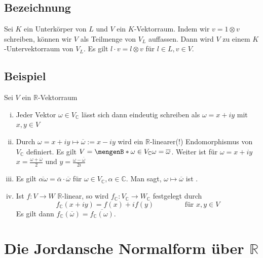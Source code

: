 \subsection[Bezeichnung von $V$ als Untervektorraum von $V_L$]{Bezeichnung} %
\label{sub:1014}
Sei $K$ ein Unterkörper von $L$ und $V$ ein $K$-Vektorraum. Indem wir $v= 1 \otimes v$ schreiben, können wir $V$ als Teilmenge von $V_L$ auffassen. Dann wird $V$ zu
einem $K$-Untervektorraum von $V_L$. Es gilt $l \cdot v = l \otimes v$ für $l \in L, v \in V$.

\subsection[Beispiel anhand eines $\mathds{R}$-Vektorraums $V$]{Beispiel} %
\label{sub:1015}
Sei $V$ ein $\mathds{R}$-Vektorraum
\begin{enumerate}[i)]
	\item Jeder Vektor $\omega \in V_\mathds{C}$ lässt sich dann eindeutig schreiben als $\omega = x + i y$ mit $x,y \in V$
	\item Durch $\omega= x+i y \mapsto \overline{\omega} := x - iy$ wird ein $\mathds{R}$-linearer(!) Endomorphismus von $V_\mathds{C}$ definiert. Es gilt 
	$V= \set[\omega \in V_\mathds{C}]{\omega= \overline{\omega} } $. Weiter ist für $\omega= x+ iy$ $x= \frac{\omega+ \overline{\omega} }{2} $ und $y= \frac{\omega- \overline{\omega} }{2i} $
	\item Es gilt $\overline{\alpha \omega} = \overline{\alpha} \cdot  \overline{\omega}$ für $\omega \in V_\mathds{C}, \alpha \in \mathds{C}$. Man sagt, $\omega \mapsto \overline{\omega}$ ist
	.
	\item Ist $f : V \to W$ $\mathds{R}$-linear, so wird $f_\mathds{C} : V_\mathds{C} \to W_\mathds{C}$ festgelegt durch 
	\[
		f_\mathds{C} (x+iy) = f(x) + i f(y) \qquad \qquad \text{ für } x,y \in V 
	\] 
	Es gilt dann $f_\mathds{C} ( \overline{\omega} ) = \overline{f_\mathds{C} (\omega)} $.
\end{enumerate}
\newpage
\section{Die Jordansche Normalform über $\mathds{R}$} %
\label{sec:11}
